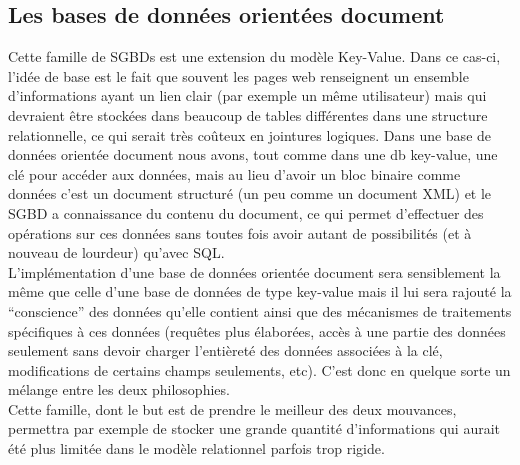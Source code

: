 \documentclass[11pt]{article}
\begin{document}
\subsection{Les bases de données orientées document}
Cette famille de SGBDs est une extension du modèle Key-Value. Dans ce cas-ci, l'idée de base est le fait que souvent les pages web renseignent un ensemble d'informations ayant un lien clair (par exemple un même utilisateur) mais qui devraient être stockées dans beaucoup de tables différentes dans une structure relationnelle, ce qui serait très coûteux en jointures logiques. Dans une base de données orientée document nous avons, tout comme dans une db key-value, une clé pour accéder aux données, mais au lieu d'avoir un bloc binaire comme données c'est un document structuré (un peu comme un document XML) et le SGBD a connaissance du contenu du document, ce qui permet d'effectuer des opérations sur ces données sans toutes fois avoir autant de possibilités (et à nouveau de lourdeur) qu'avec SQL. \\
L'implémentation d'une base de données orientée document sera sensiblement la même que celle d'une base de données de type key-value mais il lui sera rajouté la ``conscience'' des données qu'elle contient ainsi que des mécanismes de traitements spécifiques à ces données (requêtes plus élaborées, accès à une partie des données seulement sans devoir charger l'entièreté des données associées à la clé, modifications de certains champs seulements, etc). C'est donc en quelque sorte un mélange entre les deux philosophies. \\
Cette famille, dont le but est de prendre le meilleur des deux mouvances, permettra par exemple de stocker une grande quantité d'informations qui aurait été plus limitée dans le modèle relationnel parfois trop rigide.
\end{document}
